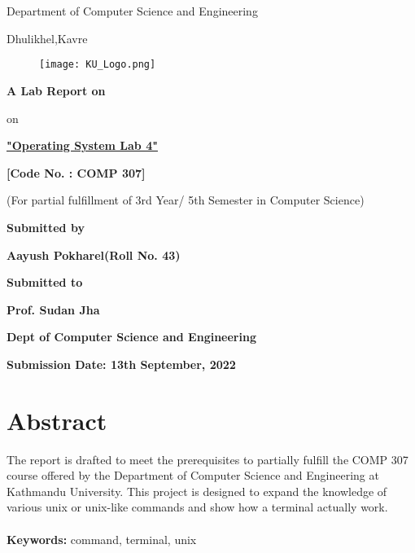 \documentclass{article}
\begin{document}
\thispagestyle{empty}

\section*{}
{\LARGE{}}

\centerline{Department of Computer Science and Engineering}
\centerline{Dhulikhel,Kavre}
\begin{figure}[h]
    \centerline{\texttt{[image: KU\_Logo.png]}}
\end{figure}

\centerline{\textbf{A Lab Report on}}
\centerline{on}
\centerline{\underline{\textbf{"Operating System Lab 4"}}}

\vspace*{22mm}

\centerline{\textbf{[Code No. : COMP 307]}}
\centerline{(For partial fulfillment of 3rd Year/ 5th Semester in Computer Science)}

\vspace*{40mm}

\centerline{\textbf{Submitted by}}
\centerline{\textbf{Aayush Pokharel(Roll No. 43)}}


\vspace*{16mm}


\centerline{\textbf{Submitted to}}
\centerline{\textbf{Prof. Sudan Jha}}
\centerline{\textbf{Dept of Computer Science and Engineering}}

\vspace*{10mm}

\centerline{\textbf{Submission Date: 13th September, 2022}}



\clearpage
\thispagestyle{empty}

\section*{Abstract}
The report is drafted to meet the prerequisites to partially fulfill the COMP 307 course offered by the Department of Computer Science and Engineering at Kathmandu University. This project is designed to expand the knowledge of various unix or unix-like commands and show how a terminal actually work.
\\\\
\textbf{Keywords:} command, terminal, unix
\clearpage
\thispagestyle{empty}
\tableofcontents

\clearpage
\thispagestyle{empty}
\end{document}
